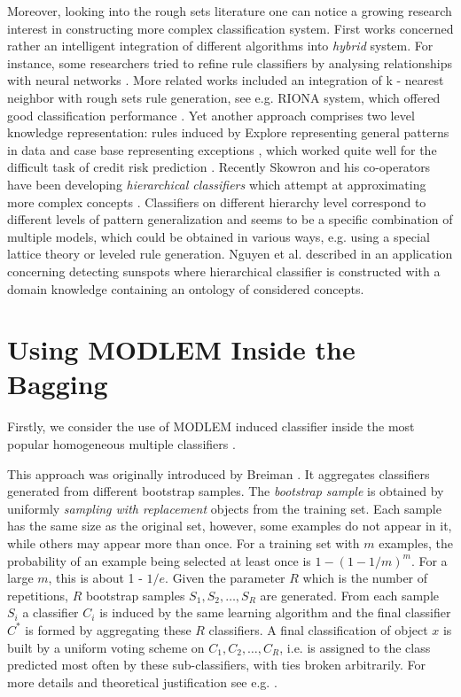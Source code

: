 \documentclass{llncs}
\begin{document}
Moreover, looking into the rough sets literature one can notice a growing
research interest in constructing more complex classification system. First
works concerned rather an intelligent integration of different algorithms
into {\em hybrid} system. For instance, some researchers tried to refine
rule classifiers by analysing relationships with neural networks
\cite{szczuka}. More related works included an integration of k - nearest
neighbor with rough sets rule generation, see e.g. RIONA system, which
offered good classification performance \cite{gorawojna}.  Yet another
approach comprises two level knowledge representation: rules induced by
Explore representing general patterns in data and case base representing
exceptions \cite{Stef01}, which worked quite well for the difficult task of
credit risk prediction \cite{st3}. Recently Skowron and his co-operators
have been developing {\em hierarchical classifiers} which attempt at
approximating more complex concepts \cite{bazan04}. Classifiers on different
hierarchy level correspond to different levels of pattern generalization and
seems to be a specific combination of multiple models, which could be
obtained in various ways, e.g. using a special lattice theory \cite{dunch}
or leveled rule generation. Nguyen et al.  described in \cite{nguyen05} an
application concerning detecting sunspots where hierarchical classifier is
constructed with a domain knowledge containing an ontology of considered
concepts.


\section{Using MODLEM Inside the Bagging}

Firstly, we consider the use of MODLEM induced classifier inside the most
popular homogeneous multiple classifiers \cite{Uppsala}.

This approach  was originally introduced by Breiman \cite{Bre}. It
aggregates classifiers generated from different bootstrap samples. The {\it
bootstrap sample} is obtained by uniformly {\em sampling with replacement}
objects from the training set. Each sample has the same size as the original
set, however, some examples do not appear in it, while others may appear
more than once. For a training set with $m$ examples, the probability of an
example being selected at least once is $1 -(1 - 1/m)^m$. For a large $m$,
this is about 1 - $1/e$. Given the parameter $R$ which is the number of
repetitions, $R$ bootstrap samples $S_1, S_2,\ldots ,S_R$ are generated.
From each sample $S_i$ a classifier $C_i$ is induced by the same learning
algorithm and the final classifier $C^*$ is formed by aggregating these $R$
classifiers. A final classification of object $x$ is built by a uniform
voting scheme on $C_1,C_2,\ldots, C_R$, i.e. is assigned to the class
predicted most often by these sub-classifiers, with ties broken arbitrarily.
For more details and theoretical justification see e.g. \cite{Bre}.
\end{document}
